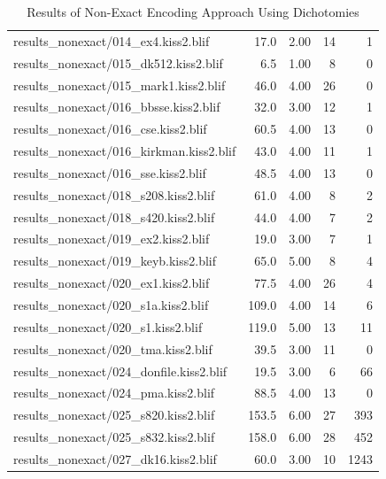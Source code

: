 \begin{table}[h]
\begin{tabular}{|l|r|r|r|r|}
results\_nonexact/014\_ex4.kiss2.blif & 17.0 & 2.00 & 14 & 1 \\
results\_nonexact/015\_dk512.kiss2.blif & 6.5 & 1.00 & 8 & 0 \\
results\_nonexact/015\_mark1.kiss2.blif & 46.0 & 4.00 & 26 & 0 \\
results\_nonexact/016\_bbsse.kiss2.blif & 32.0 & 3.00 & 12 & 1 \\
results\_nonexact/016\_cse.kiss2.blif & 60.5 & 4.00 & 13 & 0 \\
results\_nonexact/016\_kirkman.kiss2.blif & 43.0 & 4.00 & 11 & 1 \\
results\_nonexact/016\_sse.kiss2.blif & 48.5 & 4.00 & 13 & 0 \\
results\_nonexact/018\_s208.kiss2.blif & 61.0 & 4.00 & 8 & 2 \\
results\_nonexact/018\_s420.kiss2.blif & 44.0 & 4.00 & 7 & 2 \\
results\_nonexact/019\_ex2.kiss2.blif & 19.0 & 3.00 & 7 & 1 \\
results\_nonexact/019\_keyb.kiss2.blif & 65.0 & 5.00 & 8 & 4 \\
results\_nonexact/020\_ex1.kiss2.blif & 77.5 & 4.00 & 26 & 4 \\
results\_nonexact/020\_s1a.kiss2.blif & 109.0 & 4.00 & 14 & 6 \\
results\_nonexact/020\_s1.kiss2.blif & 119.0 & 5.00 & 13 & 11 \\
results\_nonexact/020\_tma.kiss2.blif & 39.5 & 3.00 & 11 & 0 \\
results\_nonexact/024\_donfile.kiss2.blif & 19.5 & 3.00 & 6 & 66 \\
results\_nonexact/024\_pma.kiss2.blif & 88.5 & 4.00 & 13 & 0 \\
results\_nonexact/025\_s820.kiss2.blif & 153.5 & 6.00 & 27 & 393 \\
results\_nonexact/025\_s832.kiss2.blif & 158.0 & 6.00 & 28 & 452 \\
results\_nonexact/027\_dk16.kiss2.blif & 60.0 & 3.00 & 10 & 1243 \\
		\hline
	\end{tabular}
	\caption{Results of Non-Exact Encoding Approach Using Dichotomies}
	\label{tab:nonexact}
\end{table}
